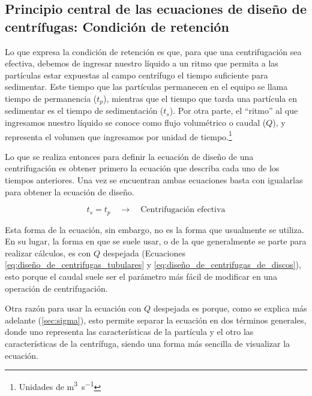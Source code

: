 \documentclass{AsignaturaResumen}
\begin{document}
\subsection{Principio central de las ecuaciones de diseño de centrífugas: Condición de retención}\label{sec:condicion_de_retencion}


Lo que expresa la condición de retención es que, para que una centrifugación sea efectiva, debemos de ingresar nuestro líquido a un ritmo que permita a las partículas estar expuestas al campo centrífugo el tiempo suficiente para sedimentar. Este tiempo que las partículas permanecen en el equipo se llama tiempo de permanencia ($t_{p}$), mientras que el tiempo que tarda una partícula en sedimentar es el tiempo de sedimentación ($t_{s}$). Por otra parte, el ``ritmo'' al que ingresamos nuestro líquido se conoce como flujo volumétrico o caudal ($Q$), y representa el volumen que ingresamos por unidad de tiempo.\footnote{Unidades de \unit{\m\cubed\per\s}}

Lo que se realiza entonces para definir la ecuación de diseño de una centrifugación es obtener primero la ecuación que describa cada uno de los tiempos anteriores. Una vez se encuentran ambas ecuaciones basta con igualarlas para obtener la ecuación de diseño.

\begin{equation}\label{eq:condicion_de_retencion}
    t_{s} = t_{p}  \quad\longrightarrow\quad \text{Centrifugación efectiva}
\end{equation}

Esta forma de la ecuación, sin embargo, no es la forma que usualmente se utiliza. En su lugar, la forma en que se suele usar, o de la que generalmente se parte para realizar cálculos, es con $Q$ despejada (Ecuaciones \ref{eq:diseño_de_centrifugas_tubulares} y \ref{eq:diseño_de_centrifugas_de_discos}), esto porque el caudal suele ser el parámetro más fácil de modificar en una operación de centrifugación. 

Otra razón para usar la ecuación con $Q$ despejada es porque, como se explica más adelante (\autoref{sec:sigma}), esto permite \hypertarget{introduccion_a_sigma}{separar la ecuación} en dos términos generales, donde uno representa las características de la partícula y el otro las características de la centrífuga, siendo una forma más sencilla de visualizar la ecuación.
\end{document}
